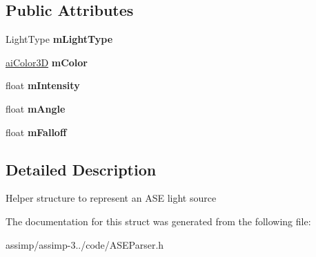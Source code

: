 \subsection*{Public Attributes}
\begin{DoxyCompactItemize}
\item 
\hypertarget{struct_assimp_1_1_a_s_e_1_1_light_a390e3d905715f80cfc5bc02b62f36380}{Light\+Type {\bfseries m\+Light\+Type}}\label{struct_assimp_1_1_a_s_e_1_1_light_a390e3d905715f80cfc5bc02b62f36380}

\item 
\hypertarget{struct_assimp_1_1_a_s_e_1_1_light_a4e228a3934675b05023c891f8b78d807}{\hyperlink{structai_color3_d}{ai\+Color3\+D} {\bfseries m\+Color}}\label{struct_assimp_1_1_a_s_e_1_1_light_a4e228a3934675b05023c891f8b78d807}

\item 
\hypertarget{struct_assimp_1_1_a_s_e_1_1_light_ab08cc9b647e3e50e68ef9386002fc2e0}{float {\bfseries m\+Intensity}}\label{struct_assimp_1_1_a_s_e_1_1_light_ab08cc9b647e3e50e68ef9386002fc2e0}

\item 
\hypertarget{struct_assimp_1_1_a_s_e_1_1_light_ad5201de981e3e6274ad039fb710626e5}{float {\bfseries m\+Angle}}\label{struct_assimp_1_1_a_s_e_1_1_light_ad5201de981e3e6274ad039fb710626e5}

\item 
\hypertarget{struct_assimp_1_1_a_s_e_1_1_light_a65f5c25b5df59438eced123593351586}{float {\bfseries m\+Falloff}}\label{struct_assimp_1_1_a_s_e_1_1_light_a65f5c25b5df59438eced123593351586}

\end{DoxyCompactItemize}


\subsection{Detailed Description}
Helper structure to represent an A\+S\+E light source 

The documentation for this struct was generated from the following file\+:\begin{DoxyCompactItemize}
\item 
assimp/assimp-\/3../code/A\+S\+E\+Parser.\+h\end{DoxyCompactItemize}
